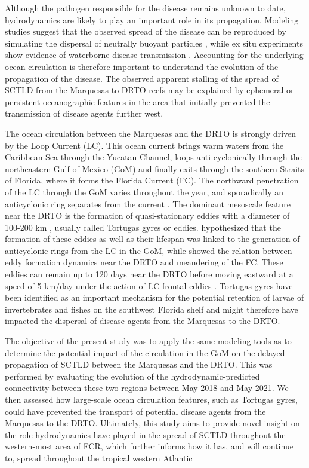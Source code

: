 Although the pathogen responsible for the disease remains unknown to date, hydrodynamics are likely to play an important role in its propagation. Modeling studies suggest that the observed spread of the disease can be reproduced by simulating the dispersal of neutrally buoyant particles \citep{dobbelaere2020coupled}, while ex situ experiments show evidence of waterborne disease transmission \citep{aeby2019pathogenesis, eaton2021measuring,meiling2021variable}. Accounting for the underlying ocean circulation is therefore important to understand the evolution of the propagation of the disease. The observed apparent stalling of the spread of SCTLD from the Marquesas to DRTO reefs may be explained by ephemeral or persistent oceanographic features in the area that initially prevented the transmission of disease agents further west.

The ocean circulation between the Marquesas and the DRTO is strongly driven by the Loop Current (LC). This ocean current brings warm waters from the Caribbean Sea through the Yucatan Channel, loops anti-cyclonically through the northeastern Gulf of Mexico (GoM) and finally exits through the southern Straits of Florida, where it forms the Florida Current (FC). The northward penetration of the LC through the GoM varies throughout the year, and sporadically an anticyclonic ring separates from the current \citep{leipper1970sequence, maul1977annual,vukovich1988loop}. The dominant mesoscale feature near the DRTO is the formation of quasi-stationary eddies with a diameter of 100-200 km \citep{lee1994evolution,fratantoni1998influence}, usually called Tortugas gyres or eddies. \cite{fratantoni1998influence} hypothesized that the formation of these eddies as well as their lifespan was linked to the generation of anticyclonic rings from the LC in the GoM, while \cite{kourafalou2012florida} showed the relation between eddy formation dynamics near the DRTO and meandering of the FC. These eddies can remain up to 120 days near the DRTO before moving eastward at a speed of 5 km/day under the action of LC frontal eddies \citep{maul1977annual}. Tortugas gyres have been identified as an important mechanism for the potential retention of larvae of invertebrates and fishes on the southwest Florida shelf \citep{lee1994evolution, sponaugle2005florida, kourafalou2012florida} and might therefore have impacted the dispersal of disease agents from the Marquesas to the DRTO.

The objective of the present study was to apply the same modeling tools as \cite{dobbelaere2020coupled} to determine the potential impact of the circulation in the GoM on the delayed propagation of SCTLD between the Marquesas and the DRTO. This was performed by evaluating the evolution of the hydrodynamic-predicted connectivity between these two regions between May 2018 and May 2021. We then assessed how large-scale ocean circulation features, such as Tortugas gyres, could have prevented the transport of potential disease agents from the Marquesas to the DRTO. Ultimately, this study aims to provide novel insight on the role hydrodynamics have played in the spread of SCTLD throughout the western-most area of FCR, which further informs how it has, and will continue to, spread throughout the tropical western Atlantic

